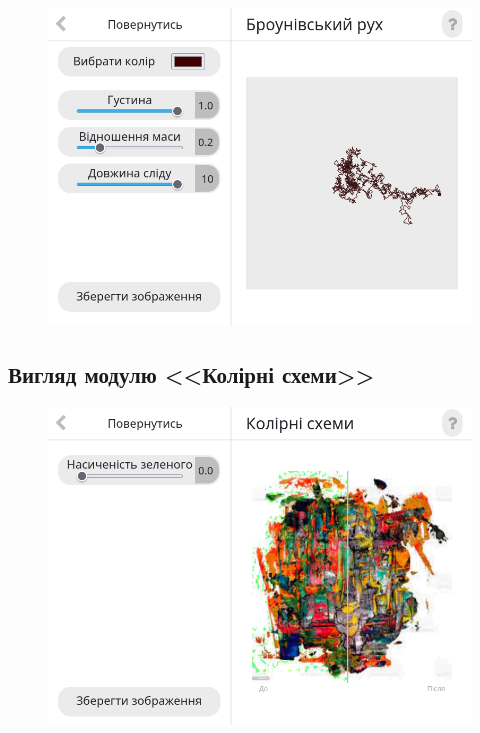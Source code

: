 \documentclass[oneside,14pt]{extarticle}
\begin{document}
\begin{normalsize}
	\begin{figure}[H]
		\centering
		\includegraphics[scale=0.6]{21}
		\caption{}
	\end{figure}
	
	\subsection{Вигляд модулю <<Колірні схеми>>}
	\begin{figure}[H]
		\centering
		\includegraphics[scale=0.6]{31}
		\caption{}
	\end{figure}
	

\end{normalsize}
\end{document}
